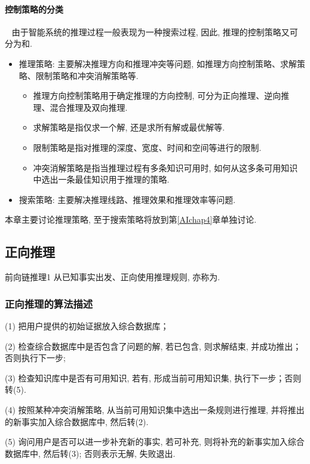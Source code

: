 \paragraph{控制策略的分类}~{}
由于智能系统的推理过程一般表现为一种搜索过程, 因此, 推理的控制策略又可分为和.
\begin{itemize}
\item 推理策略: 主要解决推理方向和推理冲突等问题, 如推理方向控制策略、求解策略、限制策略和冲突消解策略等.
    \begin{itemize}
    \item 推理方向控制策略用于确定推理的方向控制, 可分为正向推理、逆向推理、混合推理及双向推理.
    \item 求解策略是指仅求一个解, 还是求所有解或最优解等.
    \item 限制策略是指对推理的深度、宽度、时间和空间等进行的限制.
    \item 冲突消解策略是指当推理过程有多条知识可用时, 如何从这多条可用知识中选出一条最佳知识用于推理的策略.
    \end{itemize}
\item 搜索策略: 主要解决推理线路、推理效果和推理效率等问题.
\end{itemize}
本章主要讨论推理策略, 至于搜索策略将放到第\ref{AIchap4}章单独讨论.
\subsection{正向推理}
\begin{mydef}{前向链推理}{1}
从已知事实出发、正向使用推理规则, 亦称为.
\end{mydef}
\subsubsection{正向推理的算法描述}

(1) 把用户提供的初始证据放入综合数据库；

(2) 检查综合数据库中是否包含了问题的解, 若已包含, 则求解结束, 并成功推出；否则执行下一步;

(3) 检查知识库中是否有可用知识, 若有, 形成当前可用知识集, 执行下一步；否则转(5).

(4) 按照某种冲突消解策略, 从当前可用知识集中选出一条规则进行推理, 并将推出的新事实加入综合数据库中, 然后转(2).

(5) 询问用户是否可以进一步补充新的事实, 若可补充, 则将补充的新事实加入综合数据库中, 然后转(3); 否则表示无解, 失败退出.

